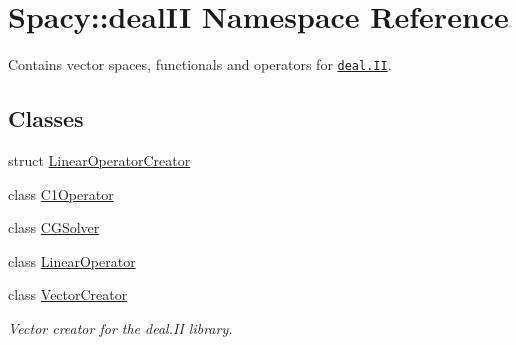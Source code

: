 \hypertarget{namespaceSpacy_1_1dealII}{\section{\-Spacy\-:\-:deal\-I\-I \-Namespace \-Reference}
\label{namespaceSpacy_1_1dealII}
}


\-Contains vector spaces, functionals and operators for \href{www.deal.org}{\tt deal.\-I\-I}.  


\subsection*{\-Classes}
\begin{DoxyCompactItemize}
\item 
struct \hyperlink{structSpacy_1_1dealII_1_1LinearOperatorCreator}{\-Linear\-Operator\-Creator}
\item 
class \hyperlink{classSpacy_1_1dealII_1_1C1Operator}{\-C1\-Operator}
\item 
class \hyperlink{classSpacy_1_1dealII_1_1CGSolver}{\-C\-G\-Solver}
\item 
class \hyperlink{classSpacy_1_1dealII_1_1LinearOperator}{\-Linear\-Operator}
\item 
class \hyperlink{classSpacy_1_1dealII_1_1VectorCreator}{\-Vector\-Creator}
\begin{DoxyCompactList}\small\item\em \-Vector creator for the deal.\-I\-I library. \end{DoxyCompactList}\end{DoxyCompactItemize}
